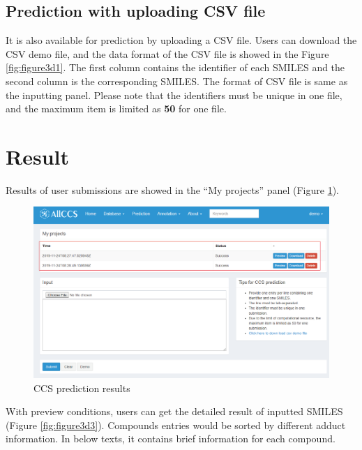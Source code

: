 \documentclass[12pt,]{book}
\begin{document}
\subsection{Prediction with uploading CSV file}\label{chapter3d1d2}

It is also available for prediction by uploading a CSV file. Users can
download the CSV demo file, and the data format of the CSV file is
showed in the Figure \ref{fig:figure3d1}. The first column contains the
identifier of each SMILES and the second column is the corresponding
SMILES. The format of CSV file is same as the inputting panel. Please
note that the identifiers must be unique in one file, and the maximum
item is limited as \textbf{50} for one file.

\section{Result}\label{chapter3d2}

Results of user submissions are showed in the ``My projects'' panel
(Figure \ref{fig:figure3d2}).

\begin{figure}

{\centering \includegraphics{images/chapter3/figure3.2prediction_result} 

}

\caption{CCS prediction results}\label{fig:figure3d2}
\end{figure}

With preview conditions, users can get the detailed result of inputted
SMILES (Figure \ref{fig:figure3d3}). Compounds entries would be sorted
by different adduct information. In below texts, it contains brief
information for each compound.
\end{document}
